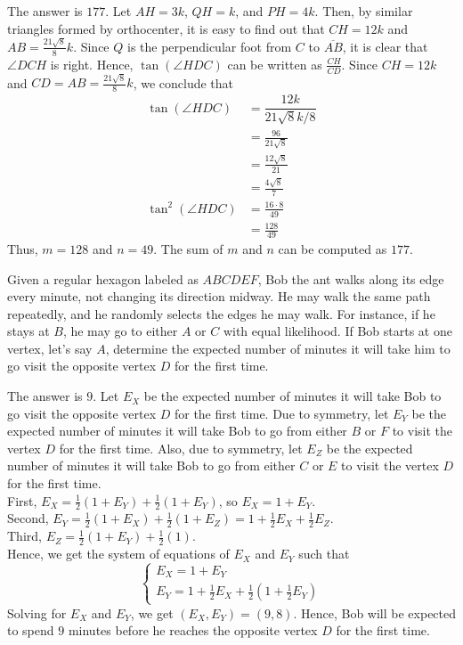 \begin{solution}
The answer is $177$. Let $AH=3k$, $QH=k$, and $PH=4k$. Then, by similar triangles formed by orthocenter, it is easy to find out that $CH=12k$ and $AB=\frac{21\sqrt{8}}{8}k$. Since $Q$ is the perpendicular foot from $C$ to $\overline{AB}$, it is clear that $\angle DCH$ is right. Hence, $\tan(\angle HDC)$ can be written as $\frac{CH}{CD}$. Since $CH=12k$ and $CD=AB=\frac{21\sqrt{8}}{8}k$, we conclude that
\begin{align*}
	\tan(\angle HDC)&=\dfrac{12k}{21\sqrt{8}k/8}\\
	&=\frac{96}{21\sqrt{8}}\\
	&=\frac{12\sqrt{8}}{21}\\
	&=\frac{4\sqrt{8}}{7}\\
	\tan^2(\angle HDC)&=\frac{16\cdot 8}{49}\\
	&=\frac{128}{49}
\end{align*}
Thus, $m=128$ and $n=49$. The sum of $m$ and $n$ can be computed as $177$.
\end{solution}

\begin{problem}
Given a regular hexagon labeled as $ABCDEF$, Bob the ant walks along its edge every minute, not changing its direction midway. He may walk the same path repeatedly, and he randomly selects the edges he may walk. For instance, if he stays at $B$, he may go to either $A$ or $C$ with equal likelihood. If Bob starts at one vertex, let's say $A$, determine the expected number of minutes it will take him to go visit the opposite vertex  $D$ for the first time.
\end{problem}

\begin{solution}
The answer is $9$. Let $E_X$ be the expected number of minutes it will take Bob to go visit the opposite vertex $D$ for the first time. Due to symmetry, let $E_Y$ be the expected number of minutes it will take Bob to go from either $B$ or $F$ to visit the vertex $D$ for the first time. Also, due to symmetry, let $E_Z$ be the expected number of minutes it will take Bob to go from either $C$ or $E$ to visit the vertex $D$ for the first time.\\
\bigskip
First, $E_X=\frac{1}{2}(1+E_Y)+\frac{1}{2}(1+E_Y)$, so $E_X=1+E_Y$.\\
Second, $E_Y=\frac{1}{2}(1+E_X)+\frac{1}{2}(1+E_Z)=1+\frac{1}{2}E_X+\frac{1}{2}E_Z$.\\
Third, $E_Z=\frac{1}{2}(1+E_Y)+\frac{1}{2}(1)$.\\
\bigskip
Hence, we get the system of equations of $E_X$ and $E_Y$ such that
\[
\begin{cases}
	E_X=1+E_Y\\
	E_Y=1+\frac12E_X+\frac12(1+\frac12E_Y)
\end{cases}
\]
Solving for $E_X$ and $E_Y$, we get $(E_X,E_Y)=(9,8)$. Hence, Bob will be expected to spend $9$ minutes before he reaches the opposite vertex $D$ for the first time.
\end{solution}

